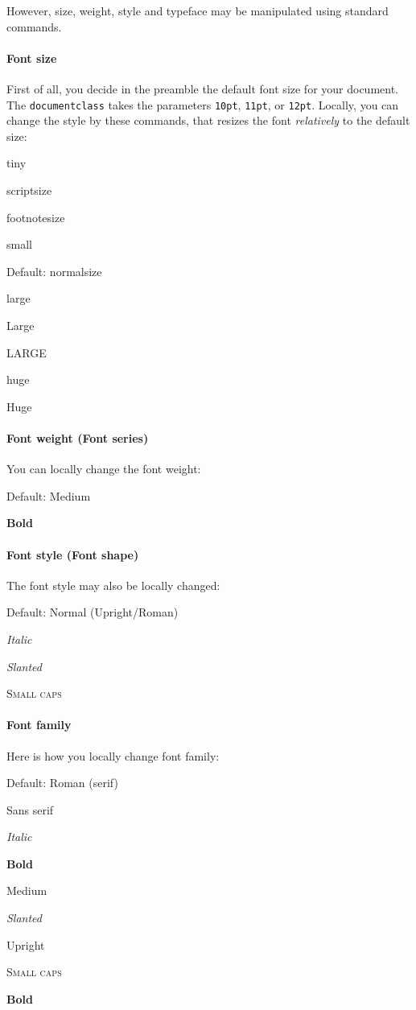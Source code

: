 However, size, weight, style and typeface may be manipulated using standard commands.

\paragraph{Font size}

First of all, you decide in the preamble the default font size for your document. The \texttt{documentclass} takes the parameters \texttt{10pt},  \texttt{11pt},  or \texttt{12pt}. Locally, you can change the style by these commands, that resizes the font {\em relatively} to the default size:

    \tiny tiny
    
    \scriptsize scriptsize
    
    \footnotesize footnotesize
    
    \small small
    
    \normalsize Default: normalsize
    
    \large  large
    
    \Large Large
    
    \LARGE LARGE
    
    \huge huge
    
    \Huge  Huge
    
    \normalsize 
    
\paragraph{Font weight (Font series)}
You can locally change the font weight:
    
    \textmd{Default: Medium}
    
    \textbf{Bold}
    
    
\paragraph{Font style (Font shape)}
The font style may also be locally changed:
    
    \textup{Default: Normal (Upright/Roman)}
    
    \textit{Italic}
    
    \textsl{Slanted}
    
    \textsc{Small caps}
    
\paragraph{Font family}
Here is how you locally change font family:
 \begin{compactitem}
  \item \textrm{Default: Roman (serif)}
  \item \textsf{Sans serif}
  \item \textit{Italic}
  \item \textbf{Bold}
  \item \textmd{Medium}
  \item \textsl{Slanted}
  \item \textup{Upright}
  \item \textsc{Small caps}
  \item \textbf{Bold}
 \end{compactitem}   
    
